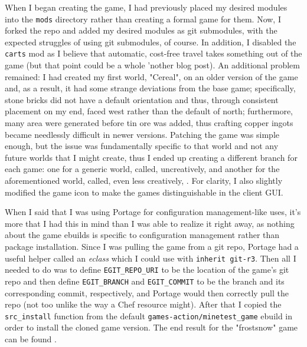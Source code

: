 \documentclass{article}
\begin{document}
When I began creating the game, I had previously placed my desired modules into the \texttt{mods} directory rather than creating a formal game for them.  Now, I forked the  repo and added my desired modules as git submodules, with the expected struggles of using git submodules, of course.  In addition, I disabled the \texttt{carts} mod as I believe that automatic, cost-free travel takes something out of the game (but that point could be a whole 'nother blog post).  An additional problem remained: I had created my first world, "Cereal", on an older version of the game and, as a result, it had some strange deviations from the base game; specifically, stone bricks did not have a default orientation and thus, through consistent placement on my end, faced west rather than the default of north; furthermore, many area were generated before tin ore was added, thus crafting copper ingots became needlessly difficult in newer versions.  Patching the game was simple enough, but the issue was fundamentally specific to that world and not any future worlds that I might create, thus I ended up creating a different branch for each game: one for a generic world, called, uncreatively,  and another for the aforementioned world, called, even less creatively, .  For clarity, I also slightly modified the game icon to make the games distinguishable in the client GUI.

When I said that I was using Portage for configuration management-like uses, it's more that I had this in mind than I was able to realize it right away, as nothing about the game ebuilds is specific to configuration management rather than package installation.  Since I was pulling the game from a git repo, Portage had a useful helper called an \emph{eclass} which I could use with \texttt{inherit git-r3}.  Then all I needed to do was to define \texttt{EGIT_REPO_URI} to be the location of the game's git repo and then define \texttt{EGIT_BRANCH} and \texttt{EGIT_COMMIT} to be the branch and its corresponding commit, respectively, and Portage would then correctly pull the repo (not too unlike the way a Chef resource might).  After that I copied the \texttt{src_install} function from the default \texttt{games-action/minetest_game} ebuild in order to install the cloned game version.  The end result for the "frostsnow" game can be found .
\end{document}
